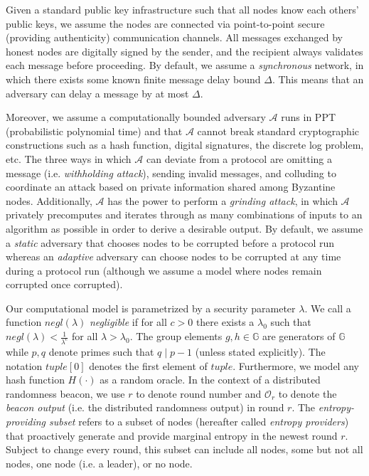 \documentclass[letterpaper,twocolumn,10pt]{article}
\theoremstyle{definition}
\theoremstyle{remark}
\begin{document}
Given a standard public key infrastructure such that all nodes know each others' public keys, we assume the nodes are connected via point-to-point secure (providing authenticity) communication channels. All messages exchanged by honest nodes are digitally signed by the sender, and the recipient always validates each message before proceeding. By default, we assume a \textit{synchronous} network, in which there exists some known finite message delay bound $\Delta$. This means that an adversary can delay a message by at most $\Delta$.

Moreover, we assume a computationally bounded adversary $\mathcal{A}$ runs in PPT (probabilistic polynomial time) and that $\mathcal{A}$ cannot break standard cryptographic constructions such as a hash function, digital signatures, the discrete log problem, etc. The three ways in which $\mathcal{A}$ can deviate from a protocol are omitting a message (i.e. \textit{withholding attack}), sending invalid messages, and colluding to coordinate an attack based on private information shared among Byzantine nodes. Additionally, $\mathcal{A}$ has the power to perform a \textit{grinding attack}, in which $\mathcal{A}$ privately precomputes and iterates through as many combinations of inputs to an algorithm as possible in order to derive a desirable output. By default, we assume a \textit{static} adversary that chooses nodes to be corrupted before a protocol run whereas an \textit{adaptive} adversary can choose nodes to be corrupted at any time during a protocol run (although we assume a model where nodes remain corrupted once corrupted).

Our computational model is parametrized by a security parameter $\lambda$. We call a function $negl(\lambda)$ \textit{negligible} if for all $c > 0$ there exists a $\lambda_0$ such that $negl(\lambda) < \frac{1}{\lambda^c}$ for all $\lambda > \lambda_0$. The group elements $g, h \in \mathbb{G}$ are generators of $\mathbb{G}$ while $p, q$ denote primes such that $q \mid p - 1$ (unless stated explicitly). The notation $tuple[0]$ denotes the first element of $tuple$. Furthermore, we model any hash function $H(\cdot)$ as a random oracle. In the context of a distributed randomness beacon, we use $r$ to denote round number and $\mathcal{O}_r$ to denote the \textit{beacon output} (i.e. the distributed randomness output) in round $r$. The \textit{entropy-providing subset} refers to a subset of nodes (hereafter called \textit{entropy providers}) that proactively generate and provide marginal entropy in the newest round $r$. Subject to change every round, this subset can include all nodes, some but not all nodes, one node (i.e. a leader), or no node.
\end{document}
